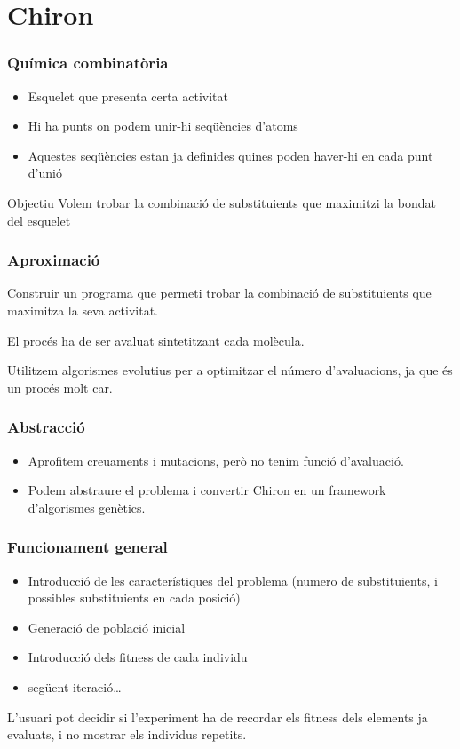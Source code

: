 \documentclass{beamer}
\begin{document}

\section{Chiron} %
\label{sec:Chiron}
\begin{frame}
	\frametitle{Química combinatòria}
	\begin{itemize}
		\item Esquelet que presenta certa activitat
		\item Hi ha punts on podem unir-hi seqüències d'atoms
		\item Aquestes seqüències estan ja definides quines poden haver-hi en cada punt d'unió
	\end{itemize}
	\pause
	\begin{block}{Objectiu}
		Volem trobar la combinació de substituients que maximitzi la bondat del esquelet
	\end{block}
\end{frame}

\begin{frame}
	\frametitle{Aproximació}
	Construir un programa que permeti trobar la combinació de substituients que
	maximitza la seva activitat.

	El procés ha de ser avaluat sintetitzant cada molècula.

	Utilitzem algorismes evolutius per a optimitzar el número d'avaluacions, ja
	que és un procés molt car.
\end{frame}

\begin{frame}
	\frametitle{Abstracció}
	\begin{itemize}
	\item Aprofitem creuaments i mutacions, però no tenim funció d'avaluació.
	\pause
	\item Podem abstraure el problema i convertir Chiron en un framework
	d'algorismes genètics.
	\end{itemize}
\end{frame}

\begin{frame}
\frametitle{Funcionament general}
\begin{itemize}
\item Introducció de les característiques del problema (numero de substituients,
i possibles substituients en cada posició)
\item Generació de població inicial
\item Introducció dels fitness de cada individu
\item següent iteració\ldots
\end{itemize}
\pause
L'usuari pot decidir si l'experiment ha de recordar els fitness dels elements ja
evaluats, i no mostrar els individus repetits.
\end{frame}
\end{document}
